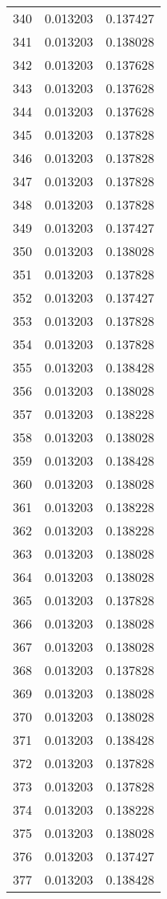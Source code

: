 \begin{longtable}{rrr}
340 & 0.013203 & 0.137427 \\
341 & 0.013203 & 0.138028 \\
342 & 0.013203 & 0.137628 \\
343 & 0.013203 & 0.137628 \\
344 & 0.013203 & 0.137628 \\
345 & 0.013203 & 0.137828 \\
346 & 0.013203 & 0.137828 \\
347 & 0.013203 & 0.137828 \\
348 & 0.013203 & 0.137828 \\
349 & 0.013203 & 0.137427 \\
350 & 0.013203 & 0.138028 \\
351 & 0.013203 & 0.137828 \\
352 & 0.013203 & 0.137427 \\
353 & 0.013203 & 0.137828 \\
354 & 0.013203 & 0.137828 \\
355 & 0.013203 & 0.138428 \\
356 & 0.013203 & 0.138028 \\
357 & 0.013203 & 0.138228 \\
358 & 0.013203 & 0.138028 \\
359 & 0.013203 & 0.138428 \\
360 & 0.013203 & 0.138028 \\
361 & 0.013203 & 0.138228 \\
362 & 0.013203 & 0.138228 \\
363 & 0.013203 & 0.138028 \\
364 & 0.013203 & 0.138028 \\
365 & 0.013203 & 0.137828 \\
366 & 0.013203 & 0.138028 \\
367 & 0.013203 & 0.138028 \\
368 & 0.013203 & 0.137828 \\
369 & 0.013203 & 0.138028 \\
370 & 0.013203 & 0.138028 \\
371 & 0.013203 & 0.138428 \\
372 & 0.013203 & 0.137828 \\
373 & 0.013203 & 0.137828 \\
374 & 0.013203 & 0.138228 \\
375 & 0.013203 & 0.138028 \\
376 & 0.013203 & 0.137427 \\
377 & 0.013203 & 0.138428 \\

\end{longtable}
